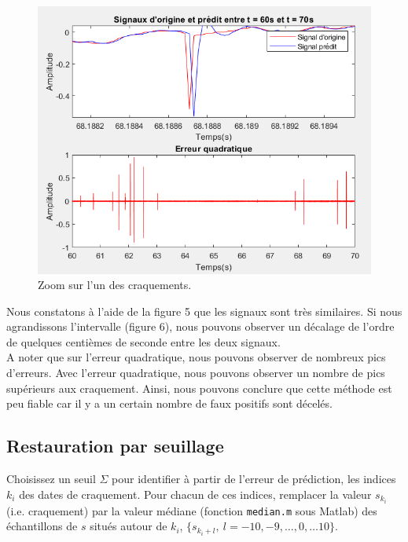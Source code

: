 \documentclass{article}
\begin{document}
\begin{figure}[!h]
    \centering
    \includegraphics[width=1\textwidth]{images/zoom.png}
    \caption{Zoom sur l'un des craquements.}
    \label{fig-binaire}
\end{figure}

Nous constatons à l'aide de la figure 5 que les signaux sont très similaires. Si nous agrandissons l'intervalle (figure 6),  nous pouvons observer un décalage de l'ordre de quelques centièmes de seconde entre les deux signaux.\\ 
A noter que sur l'erreur quadratique, nous pouvons observer  de nombreux pics d'erreurs. Avec l'erreur quadratique, nous pouvons observer un nombre de pics supérieurs aux craquement. Ainsi, nous pouvons conclure que cette méthode est peu fiable car il y a un certain nombre de faux positifs sont décelés.\\
\clearpage

\subsection{Restauration par seuillage}

Choisissez un seuil $\Sigma$ pour identifier à partir de l'erreur de prédiction, les indices $k_i$ des dates de craquement.  Pour chacun de ces indices,  remplacer la valeur $s_{k_i}$ (i.e. craquement) par la valeur médiane (fonction {\tt median.m} sous Matlab) des échantillons de $s$ situés autour de $k_i$, $\{s_{k_i+l},~l=-10, -9,\ldots, 0 , \ldots 10\}$.
\end{document}
